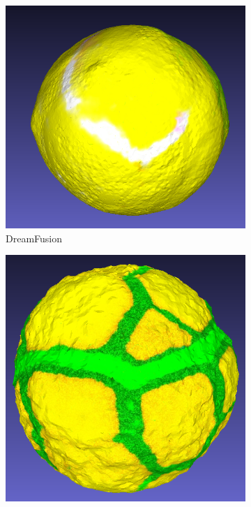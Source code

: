 \begin{figure}[ht]
    \centering
    \small
    \begin{subfigure}[b]{0.22\textwidth}
        \centering
        \includegraphics[width=\textwidth]{etc/a symmetrical tennis ball/dreamfusion/dreamfusion_ball_result.png}
        \caption{DreamFusion}
    \end{subfigure}
    \begin{subfigure}[b]{0.2\textwidth}
        \centering
        \includegraphics[width=\textwidth]{etc/a symmetrical tennis ball/magic3d/magic3d_ball_result.png}

\end{subfigure}
\end{figure}
